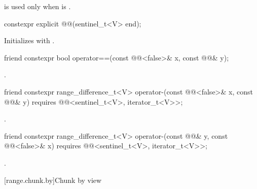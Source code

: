 \pnum
\begin{note}
 is used
only when  is .
\end{note}

%
\begin{itemdecl}
constexpr explicit @@(sentinel_t<V> end);
\end{itemdecl}

\begin{itemdescr}
\pnum
\effects
Initializes  with .
\end{itemdescr}

%
\begin{itemdecl}
friend constexpr bool operator==(const @@<false>& x, const @@& y);
\end{itemdecl}

\begin{itemdescr}
\pnum
\returns
{}.
\end{itemdescr}

%
\begin{itemdecl}
friend constexpr range_difference_t<V>
  operator-(const @@<false>& x, const @@& y)
    requires @@<sentinel_t<V>, iterator_t<V>>;
\end{itemdecl}

\begin{itemdescr}
\pnum
\returns
{}.
\end{itemdescr}

%
\begin{itemdecl}
friend constexpr range_difference_t<V>
  operator-(const @@& y, const @@<false>& x)
    requires @@<sentinel_t<V>, iterator_t<V>>;
\end{itemdecl}

\begin{itemdescr}
\pnum
\returns
{}.
\end{itemdescr}

[range.chunk.by]{Chunk by view}

